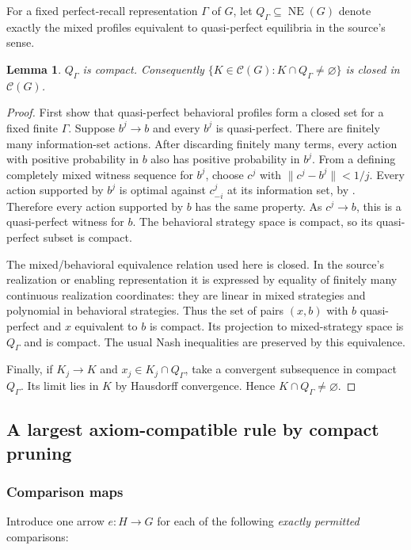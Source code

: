 \documentclass[11pt]{article}
\newtheorem{lemma}[theorem]{Lemma}
\theoremstyle{definition}
\newcommand{\NE}{\operatorname{NE}}
\newcommand{\CC}{\mathscr C}
\begin{document}
For a fixed perfect-recall representation $\Gamma$ of $G$, let
$Q_\Gamma\subseteq\NE(G)$ denote exactly the mixed profiles equivalent to
quasi-perfect equilibria in the source's sense.

\begin{lemma}\label{lem:qpcompact}
$Q_\Gamma$ is compact. Consequently
$\{K\in\CC(G):K\cap Q_\Gamma\ne\varnothing\}$ is closed in $\CC(G)$.
\end{lemma}
\begin{proof}
First show that quasi-perfect behavioral profiles form a closed set for a
fixed finite $\Gamma$. Suppose $b^j\to b$ and every $b^j$ is quasi-perfect.
There are finitely many information-set actions. After discarding finitely
many terms, every action with positive probability in $b$ also has positive
probability in $b^j$. From a defining completely mixed witness sequence for
$b^j$, choose $c^j$ with $\|c^j-b^j\|<1/j$. Every action supported by $b^j$
is optimal against $c^j_{-i}$ at its information set, by
\cite[Definition 2.1]{gw}. Therefore every action supported by $b$ has the same
property. As $c^j\to b$, this is a quasi-perfect witness for $b$.
The behavioral strategy space is compact, so its quasi-perfect subset is
compact.

The mixed/behavioral equivalence relation used here is closed. In the source's
realization or enabling representation it is expressed by equality of finitely
many continuous realization coordinates: they are linear in mixed strategies
and polynomial in behavioral strategies. Thus the set of pairs $(x,b)$ with
$b$ quasi-perfect and $x$ equivalent to $b$ is compact. Its projection to
mixed-strategy space is $Q_\Gamma$ and is compact. The usual Nash inequalities
are preserved by this equivalence.

Finally, if $K_j\to K$ and $x_j\in K_j\cap Q_\Gamma$, take a convergent
subsequence in compact $Q_\Gamma$. Its limit lies in $K$ by Hausdorff
convergence. Hence $K\cap Q_\Gamma\ne\varnothing$.
\end{proof}

\subsection{A largest axiom-compatible rule by compact pruning}\label{sec:pruning}
\subsubsection{Comparison maps}
Introduce one arrow $e:H\to G$ for each of the following \emph{exactly
permitted} comparisons:
\end{document}
